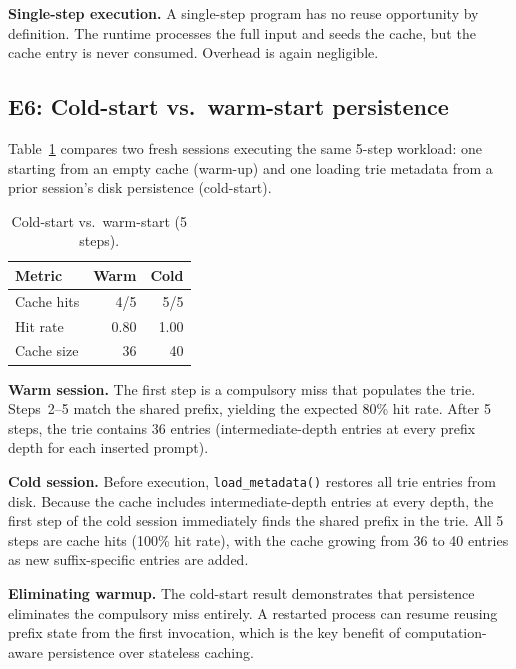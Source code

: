 \documentclass[10pt,twocolumn]{article}
\begin{document}
\textbf{Single-step execution.} A single-step program has no reuse opportunity by definition. The runtime processes the full input and seeds the cache, but the cache entry is never consumed. Overhead is again negligible.

\subsection{E6: Cold-start vs.\ warm-start persistence}

Table~\ref{tab:cold-start} compares two fresh sessions executing the same 5-step workload: one starting from an empty cache (warm-up) and one loading trie metadata from a prior session's disk persistence (cold-start).

\begin{table}[t]
\centering
{\small
\caption{Cold-start vs.\ warm-start (5 steps).}
\label{tab:cold-start}
\begin{tabular}{@{}lrr@{}}
\toprule
\textbf{Metric} & \textbf{Warm} & \textbf{Cold} \\
\midrule
Cache hits & 4/5 & 5/5 \\
Hit rate   & 0.80 & 1.00 \\
Cache size & 36   & 40   \\
\bottomrule
\end{tabular}
}
\end{table}

\textbf{Warm session.} The first step is a compulsory miss that populates the trie. Steps~2--5 match the shared prefix, yielding the expected 80\% hit rate. After 5 steps, the trie contains 36 entries (intermediate-depth entries at every prefix depth for each inserted prompt).

\textbf{Cold session.} Before execution, \texttt{load\_metadata()} restores all trie entries from disk. Because the cache includes intermediate-depth entries at every depth, the first step of the cold session immediately finds the shared prefix in the trie. All 5 steps are cache hits (100\% hit rate), with the cache growing from 36 to 40 entries as new suffix-specific entries are added.

\textbf{Eliminating warmup.} The cold-start result demonstrates that persistence eliminates the compulsory miss entirely. A restarted process can resume reusing prefix state from the first invocation, which is the key benefit of computation-aware persistence over stateless caching.
\end{document}

